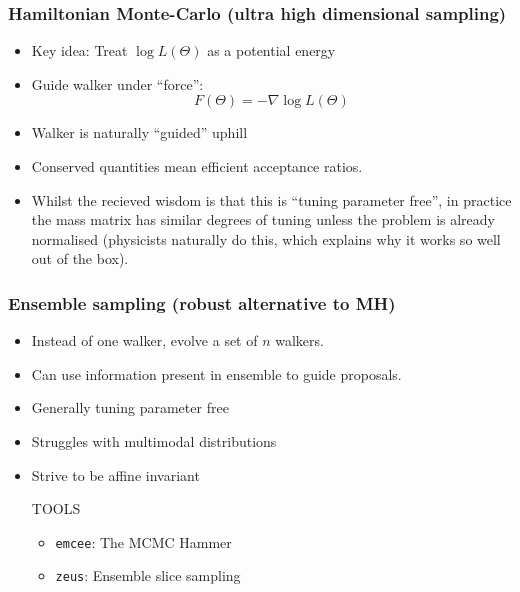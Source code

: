 \documentclass[aspectratio=169]{beamer}
\begin{document}
\begin{frame}
    \frametitle{Hamiltonian Monte-Carlo (ultra high dimensional sampling)} 
    \begin{itemize}
        \item Key idea: Treat $\log L(\Theta)$ as a potential energy
        \item Guide walker under ``force'': \[F(\Theta) =-\nabla \log L(\Theta)\]
        \item Walker is naturally ``guided'' uphill
        \item Conserved quantities mean efficient acceptance ratios.
        \item Whilst the recieved wisdom is that this is ``tuning parameter free'', in practice the mass matrix has similar degrees of tuning unless the problem is already normalised (physicists naturally do this, which explains why it works so well out of the box).
    \end{itemize}
\end{frame}

\begin{frame}
    \frametitle{Ensemble sampling (robust alternative to MH)} 
    \begin{itemize}
        \item Instead of one walker, evolve a set of $n$ walkers.
        \item Can use information present in ensemble to guide proposals.
        \item Generally tuning parameter free
        \item Struggles with multimodal distributions
        \item Strive to be affine invariant
    \begin{block}{TOOLS}
        \begin{itemize}
            \item \texttt{emcee}: The MCMC Hammer~
            \item \texttt{zeus}: Ensemble slice sampling~
        \end{itemize}
    \end{block}
    \end{itemize}
\end{frame}
\end{document}
